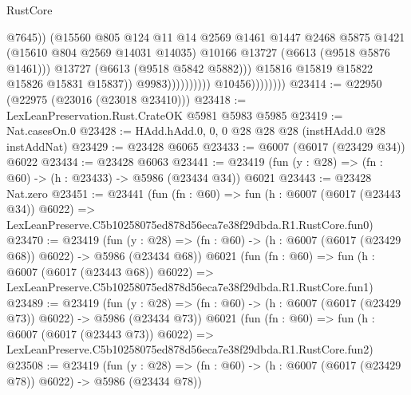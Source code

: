 \begin{lexlean}{RustCore}
\begin{coremodule}
                                                  @7645))
                                              (@15560
                                                @805
                                                @124
                                                @11
                                                @14
                                                @2569
                                                @1461
                                                @1447
                                                @2468
                                                @5875
                                                @1421
                                                (@15610 @804 @2569 @14031 @14035)
                                                @10166
                                                @13727
                                                (@6613 (@9518 @5876 @1461)))
                                              @13727
                                              (@6613 (@9518 @5842 @5882)))
                                            @15816
                                            @15819
                                            @15822
                                            @15826
                                            @15831
                                            @15837))
                                        @9983))))))))))
                    @10456))))))))
@23414 := @22950 (@22975 (@23016 (@23018 @23410)))
@23418 := LexLeanPreservation.Rust.CrateOK @5981 @5983 @5985
@23419 := Nat.casesOn.{0}
@23428 := HAdd.hAdd.{0, 0, 0} @28 @28 @28 (instHAdd.{0} @28 instAddNat)
@23429 := @23428 @6065
@23433 := @6007 (@6017 (@23429 @34)) @6022
@23434 := @23428 @6063
@23441 := @23419 (fun (y : @28) => (fn : @60) -> (h : @23433) -> @5986 (@23434 @34)) @6021
@23443 := @23428 Nat.zero
@23451 := @23441
    (fun (fn : @60) =>
    fun (h : @6007 (@6017 (@23443 @34)) @6022) =>
    LexLeanPreserve.C5b10258075ed878d56eca7e38f29dbda.R1.RustCore.fun0)
@23470 := @23419
    (fun (y : @28) => (fn : @60) -> (h : @6007 (@6017 (@23429 @68)) @6022) -> @5986 (@23434 @68))
    @6021
    (fun (fn : @60) =>
    fun (h : @6007 (@6017 (@23443 @68)) @6022) =>
    LexLeanPreserve.C5b10258075ed878d56eca7e38f29dbda.R1.RustCore.fun1)
@23489 := @23419
    (fun (y : @28) => (fn : @60) -> (h : @6007 (@6017 (@23429 @73)) @6022) -> @5986 (@23434 @73))
    @6021
    (fun (fn : @60) =>
    fun (h : @6007 (@6017 (@23443 @73)) @6022) =>
    LexLeanPreserve.C5b10258075ed878d56eca7e38f29dbda.R1.RustCore.fun2)
@23508 := @23419
    (fun (y : @28) => (fn : @60) -> (h : @6007 (@6017 (@23429 @78)) @6022) -> @5986 (@23434 @78))

\end{coremodule}
\end{lexlean}
